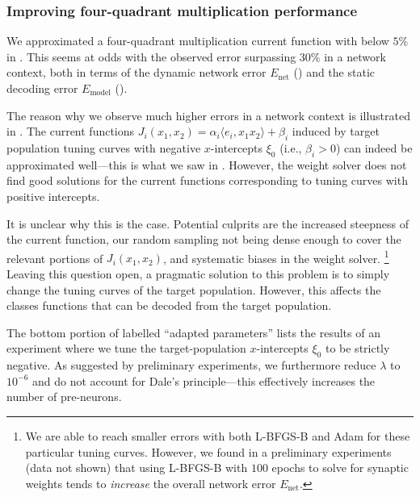\subsubsection{Improving four-quadrant multiplication performance}
We approximated a four-quadrant multiplication current function with \NRMSE below $5\%$ in .
This seems at odds with the observed error surpassing $30\%$ in a network context, both in terms of the dynamic network error $E_\mathrm{net}$ () and the static decoding error $E_\mathrm{model}$ ().

The reason why we observe much higher errors in a network context is illustrated in .
The current functions $J_i(x_1, x_2) = \alpha_i \langle e_i, x_1 x_2 \rangle + \beta_i$ induced by target population tuning curves with negative $x$-intercepts $\xi_0$ (i.e., $\beta_i > 0$) can indeed be approximated well---this is what we saw in .
However, the weight solver does not find good solutions for the current functions corresponding to tuning curves with positive intercepts.

It is unclear why this is the case.
Potential culprits are the increased steepness of the current function, our random sampling not being dense enough to cover the relevant portions of $J_i(x_1, x_2)$, and systematic biases in the weight solver.%
\footnote{
We are able to reach smaller errors with both L-BFGS-B and Adam for these particular tuning curves.
However, we found in a preliminary experiments (data not shown) that using L-BFGS-B with $100$ epochs to solve for synaptic weights tends to \emph{increase} the overall network error $E_\mathrm{net}$.
}
Leaving this question open, a pragmatic solution to this problem is to simply change the tuning curves of the target population.
However, this affects the classes functions that can be decoded from the target population.

The bottom portion of  labelled \enquote{adapted parameters} lists the results of an experiment where we tune the target-population $x$-intercepts $\xi_0$ to be strictly negative.
As suggested by preliminary experiments, we furthermore reduce $\lambda$ to $10^{-6}$ and do not account for Dale's principle---this effectively increases the number of pre-neurons.


